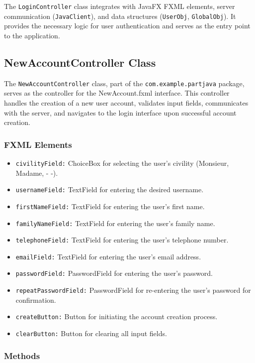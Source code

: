 \documentclass{article}
\begin{document}
The \texttt{LoginController} class integrates with JavaFX FXML elements, server communication (\texttt{JavaClient}), and data structures (\texttt{UserObj}, \texttt{GlobalObj}). It provides the necessary logic for user authentication and serves as the entry point to the application.

\subsection{NewAccountController Class}

The \texttt{NewAccountController} class, part of the \texttt{com.example.partjava} package, serves as the controller for the NewAccount.fxml interface. This controller handles the creation of a new user account, validates input fields, communicates with the server, and navigates to the login interface upon successful account creation.

\subsubsection{FXML Elements}

\begin{itemize}
    \item \texttt{civilityField:} ChoiceBox for selecting the user's civility (Monsieur, Madame, - -).
    \item \texttt{usernameField:} TextField for entering the desired username.
    \item \texttt{firstNameField:} TextField for entering the user's first name.
    \item \texttt{familyNameField:} TextField for entering the user's family name.
    \item \texttt{telephoneField:} TextField for entering the user's telephone number.
    \item \texttt{emailField:} TextField for entering the user's email address.
    \item \texttt{passwordField:} PasswordField for entering the user's password.
    \item \texttt{repeatPasswordField:} PasswordField for re-entering the user's password for confirmation.
    \item \texttt{createButton:} Button for initiating the account creation process.
    \item \texttt{clearButton:} Button for clearing all input fields.
\end{itemize}

\subsubsection{Methods}
\end{document}
